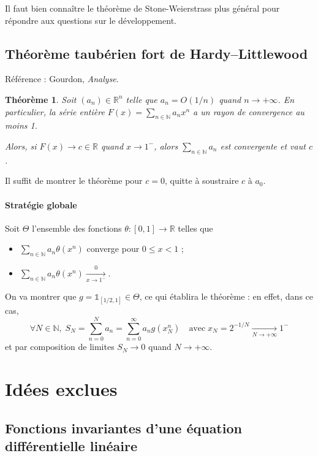 \documentclass[a4paper, 11pt]{article}
\def\N{\mathbb{N}}
\def\R{\mathbb{R}}
\def\Indic{\mathbb{1}}
\newtheorem*{theorem}{Théorème}
\begin{document}
Il faut bien connaître le théorème de Stone-Weierstrass plus général pour
répondre aux questions sur le développement.

\newpage


\subsection{Théorème taubérien fort de Hardy--Littlewood}

Référence : Gourdon, \emph{Analyse}.

\begin{theorem}
  Soit $(a_n) \in \R^n$ telle que $a_n = O(1/n)$ quand $n \to +\infty$. En
  particulier, la série entière $F(x) = \sum_{n \in \N} a_n x^n$ a un rayon de
  convergence au moins 1.

  Alors, si $F(x) \to c \in \R$ quand $x \to 1^-$, alors $\sum_{n \in \N} a_n$
  est convergente et vaut $c$.
\end{theorem}

Il suffit de montrer le théorème pour $c = 0$, quitte à soustraire $c$ à $a_0$.

\paragraph{Stratégie globale} Soit $\Theta$ l'ensemble des fonctions $\theta :
[0,1] \to \R$ telles que
\begin{itemize}
\item $\displaystyle \sum_{n \in \N} a_n \theta(x^n)$ converge pour $0 \leq x < 1$ ;
\item $\displaystyle \sum_{n \in \N} a_n \theta(x^n) \xrightarrow[x \to 1^{-}] 0$.
\end{itemize}
On va montrer que $g = \Indic_{[1/2, 1]} \in \Theta$, ce qui établira le
théorème : en effet, dans ce cas,
\[ \forall N \in \N,\; S_N =  \sum_{n = 0}^N a_n = \sum_{n = 0}^{\infty} a_n
  g(x_N^n) \quad \text{avec}\; x_N = 2^{-1/N} \xrightarrow[N \to +\infty]{} 1^- \]
et par composition de limites $S_N \rightarrow 0$ quand $N \to +\infty$.


\newpage

\section{Idées exclues}

\subsection{Fonctions invariantes d'une équation différentielle linéaire}
\end{document}
